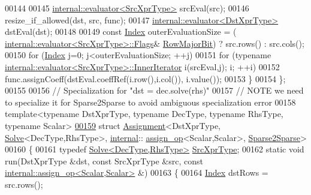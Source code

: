 \begin{DoxyCode}
00144     
00145     \hyperlink{struct_eigen_1_1internal_1_1evaluator}{internal::evaluator<SrcXprType>} srcEval(src);
00146     resize\_if\_allowed(dst, src, func);
00147     \hyperlink{struct_eigen_1_1internal_1_1evaluator}{internal::evaluator<DstXprType>} dstEval(dst);
00148     
00149     \textcolor{keyword}{const} \hyperlink{namespace_eigen_a62e77e0933482dafde8fe197d9a2cfde}{Index} outerEvaluationSize = (
      \hyperlink{struct_eigen_1_1internal_1_1evaluator}{internal::evaluator<SrcXprType>::Flags}&
      \hyperlink{group__flags_gae4f56c2a60bbe4bd2e44c5b19cbe8762}{RowMajorBit}) ? src.rows() : src.cols();
00150     \textcolor{keywordflow}{for} (\hyperlink{namespace_eigen_a62e77e0933482dafde8fe197d9a2cfde}{Index} j=0; j<outerEvaluationSize; ++j)
00151       \textcolor{keywordflow}{for} (\textcolor{keyword}{typename} \hyperlink{struct_eigen_1_1internal_1_1evaluator}{internal::evaluator<SrcXprType>::InnerIterator}
       i(srcEval,j); i; ++i)
00152         func.assignCoeff(dstEval.coeffRef(i.row(),i.col()), i.value());
00153   \}
00154 \};
00155 
00156 \textcolor{comment}{// Specialization for "dst = dec.solve(rhs)"}
00157 \textcolor{comment}{// NOTE we need to specialize it for Sparse2Sparse to avoid ambiguous specialization error}
00158 \textcolor{keyword}{template}<\textcolor{keyword}{typename} DstXprType, \textcolor{keyword}{typename} DecType, \textcolor{keyword}{typename} RhsType, \textcolor{keyword}{typename} Scalar>
\hyperlink{struct_eigen_1_1internal_1_1_assignment_3_01_dst_xpr_type_00_01_solve_3_01_dec_type_00_01_rhs_tyc354b114c08238e43cfacd9205f4688c}{00159} \textcolor{keyword}{struct }\hyperlink{struct_eigen_1_1internal_1_1_assignment}{Assignment}<DstXprType, \hyperlink{group___core___module_class_eigen_1_1_solve}{Solve}<DecType,RhsType>, \hyperlink{namespaceinternal}{internal}::
      \hyperlink{struct_eigen_1_1internal_1_1assign__op}{assign\_op}<Scalar,Scalar>, \hyperlink{struct_eigen_1_1internal_1_1_sparse2_sparse}{Sparse2Sparse}>
00160 \{
00161   \textcolor{keyword}{typedef} \hyperlink{group___core___module_class_eigen_1_1_solve}{Solve<DecType,RhsType>} \hyperlink{group___core___module_class_eigen_1_1_solve}{SrcXprType};
00162   \textcolor{keyword}{static} \textcolor{keywordtype}{void} run(DstXprType &dst, \textcolor{keyword}{const} SrcXprType &src, \textcolor{keyword}{const} 
      \hyperlink{struct_eigen_1_1internal_1_1assign__op}{internal::assign\_op<Scalar,Scalar>} &)
00163   \{
00164     \hyperlink{namespace_eigen_a62e77e0933482dafde8fe197d9a2cfde}{Index} dstRows = src.rows();

\end{DoxyCode}
